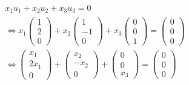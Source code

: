 \begin{align*}
    x_1u_1 + x_2u_2 + x_3u_3 = 0                                                            \\
    \Leftrightarrow x_1\begin{pmatrix}
                           1 \\ 2 \\ 0
                       \end{pmatrix} + x_2\begin{pmatrix}
                                              1 \\ -1 \\ 0
                                          \end{pmatrix} + x_3\begin{pmatrix}
                                                                 0 \\ 0 \\ 1
                                                             \end{pmatrix} = \begin{pmatrix}
                                                                                 0 \\ 0 \\ 0
                                                                             \end{pmatrix} \\
    \Leftrightarrow \begin{pmatrix}
                        x_1 \\ 2x_1 \\ 0
                    \end{pmatrix} + \begin{pmatrix}
                                        x_2 \\ -x_2 \\ 0
                                    \end{pmatrix} + \begin{pmatrix}
                                                        0 \\ 0 \\ x_3
                                                    \end{pmatrix} = \begin{pmatrix}
                                                                        0 \\ 0 \\ 0
                                                                    \end{pmatrix}          \\

\end{align*}
